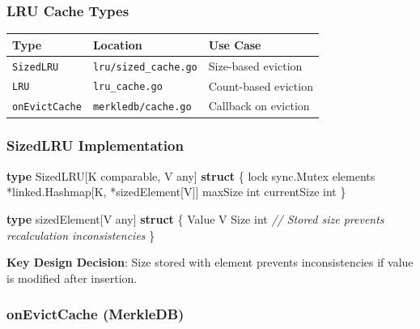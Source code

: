 \documentclass[
]{article}
\newenvironment{Shaded}{}{}
\newcommand{\CommentTok}[1]{\textcolor[rgb]{0.38,0.63,0.69}{\textit{#1}}}
\newcommand{\DataTypeTok}[1]{\textcolor[rgb]{0.56,0.13,0.00}{#1}}
\newcommand{\KeywordTok}[1]{\textcolor[rgb]{0.00,0.44,0.13}{\textbf{#1}}}
\newcommand{\NormalTok}[1]{#1}
\newcommand{\OperatorTok}[1]{\textcolor[rgb]{0.40,0.40,0.40}{#1}}
\newcounter{none} %
\begin{document}
\subsubsection{LRU Cache Types}\label{lru-cache-types}

{\def\LTcaptype{none} %
\begin{longtable}[]{@{}lll@{}}
\toprule\noalign{}
Type & Location & Use Case \\
\midrule\noalign{}
\endhead
\bottomrule\noalign{}
\endlastfoot
\texttt{SizedLRU} & \texttt{lru/sized\_cache.go} & Size-based
eviction \\
\texttt{LRU} & \texttt{lru\_cache.go} & Count-based eviction \\
\texttt{onEvictCache} & \texttt{merkledb/cache.go} & Callback on
eviction \\
\end{longtable}
}

\subsubsection{SizedLRU Implementation}\label{sizedlru-implementation}

\begin{Shaded}
\begin{Highlighting}[]
\KeywordTok{type}\NormalTok{ SizedLRU}\OperatorTok{[}\NormalTok{K }\DataTypeTok{comparable}\OperatorTok{,}\NormalTok{ V }\DataTypeTok{any}\OperatorTok{]} \KeywordTok{struct} \OperatorTok{\{}
\NormalTok{    lock        sync}\OperatorTok{.}\NormalTok{Mutex}
\NormalTok{    elements    }\OperatorTok{*}\NormalTok{linked}\OperatorTok{.}\NormalTok{Hashmap}\OperatorTok{[}\NormalTok{K}\OperatorTok{,} \OperatorTok{*}\NormalTok{sizedElement}\OperatorTok{[}\NormalTok{V}\OperatorTok{]]}
\NormalTok{    maxSize     }\DataTypeTok{int}
\NormalTok{    currentSize }\DataTypeTok{int}
\OperatorTok{\}}

\KeywordTok{type}\NormalTok{ sizedElement}\OperatorTok{[}\NormalTok{V }\DataTypeTok{any}\OperatorTok{]} \KeywordTok{struct} \OperatorTok{\{}
\NormalTok{    Value V}
\NormalTok{    Size  }\DataTypeTok{int}  \CommentTok{// Stored size prevents recalculation inconsistencies}
\OperatorTok{\}}
\end{Highlighting}
\end{Shaded}

\textbf{Key Design Decision}: Size stored with element prevents
inconsistencies if value is modified after insertion.

\subsubsection{onEvictCache (MerkleDB)}\label{onevictcache-merkledb}
\end{document}
